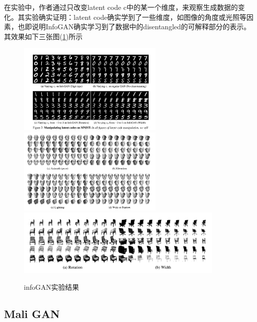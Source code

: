             \par
            在实验中，作者通过只改变latent code c中的某一个维度，来观察生成数据的变化。其实验确实证明：latent code确实学到了一些维度，如图像的角度或光照等因素，也即说明InfoGAN确实学习到了数据中的disentangled的可解释部分的表示。其效果如下三张图(\ref{fig:infoGAN实验结果})所示
                \begin{figure}[H]
                \centering
                \includegraphics[width=7cm]{images/InfoGAN1}
                \qquad
                \includegraphics[width=7cm]{images/InfoGAN2}
                \qquad
                \includegraphics[width=10cm]{images/InfoGAN3}
                \caption{infoGAN实验结果}
                \label{fig:infoGAN实验结果}
                \end{figure}

    \subsection{Mali GAN}
